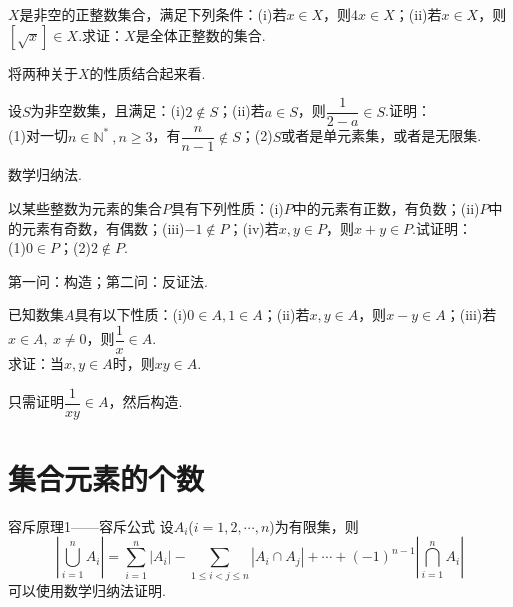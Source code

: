 \documentclass[cn,hazy,black,10pt,normal]{elegantnote}
\begin{document}
\begin{problem} %
	$X$是非空的正整数集合，满足下列条件：(i)若$x \in X$，则$4x \in X$；(ii)若$x \in X$，则$[\sqrt{x}] \in X$.求证：$X$是全体正整数的集合.
\end{problem}
\begin{hint}
	将两种关于$X$的性质结合起来看.
\end{hint}

\begin{problem} %
	设$S$为非空数集，且满足：(i)$2 \notin S$；(ii)若$a \in S$，则$\dfrac{1}{2-a} \in S$.证明： \\
	(1)对一切$n \in \mathbb{N} ^{*} ~, n \geq 3$，有$\dfrac{n}{n-1} \notin S$；(2)$S$或者是单元素集，或者是无限集.
\end{problem}
\begin{hint}
	数学归纳法.
\end{hint}

\begin{problem} %
	以某些整数为元素的集合$P$具有下列性质：(i)$P$中的元素有正数，有负数；(ii)$P$中的元素有奇数，有偶数；(iii)$-1 \notin P$；(iv)若$x,y \in P$，则$x+y \in P$.试证明： \\
	(1)$0 \in P$；(2)$2 \notin P$.
\end{problem}
\begin{hint}
	第一问：构造；第二问：反证法.
\end{hint}

\begin{problem} %
	已知数集$A$具有以下性质：(i)$0 \in A,1 \in A$；(ii)若$x,y \in A$，则$x-y \in A$；(iii)若$x \in A, ~x \neq 0$，则$\dfrac{1}{x} \in A$. \\
	求证：当$x,y \in A$时，则$xy \in A$.
\end{problem}
\begin{hint}
	只需证明$\dfrac{1}{xy} \in A$，然后构造.
\end{hint}

\newpage
\section{集合元素的个数}

\begin{theorem}{容斥原理1——容斥公式}
	设$A_i$($i=1,2, \cdots ,n$)为有限集，则
	$$|\bigcup_{i=1}^{n} A_i| = \sum_{i=1}^{n} |A_i|-\sum_{1 \leq i < j \leq n}|A_i \cap A_j| + \cdots + (-1)^{n-1} |\bigcap_{i=1}^{n} A_i|$$
	可以使用数学归纳法证明.
\end{theorem}
\end{document}
